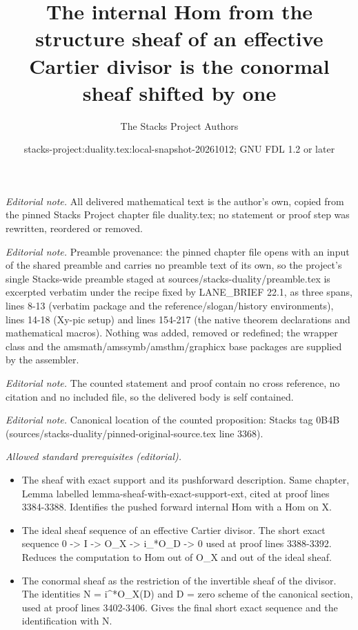 \documentclass[10pt,a4paper]{amsart}
\title{The internal Hom from the structure sheaf of an effective Cartier divisor is the conormal sheaf shifted by one}
\author{The Stacks Project Authors}
\date{stacks-project:duality.tex:local-snapshot-20261012; GNU FDL 1.2 or later}
\theoremstyle{plain}
\theoremstyle{definition}
\theoremstyle{remark}
\numberwithin{equation}{subsection}
\begin{document}
\maketitle
\noindent\textit{Editorial note.} All delivered mathematical text is the author's own, copied from the pinned Stacks Project chapter file duality.tex; no statement or proof step was rewritten, reordered or removed.\par\medskip
\noindent\textit{Editorial note.} Preamble provenance: the pinned chapter file opens with an input of the shared preamble and carries no preamble text of its own, so the project's single Stacks-wide preamble staged at sources/stacks-duality/preamble.tex is excerpted verbatim under the recipe fixed by LANE\_BRIEF 22.1, as three spans, lines 8-13 (verbatim package and the reference/slogan/history environments), lines 14-18 (Xy-pic setup) and lines 154-217 (the native theorem declarations and mathematical macros). Nothing was added, removed or redefined; the wrapper class and the amsmath/amssymb/amsthm/graphicx base packages are supplied by the assembler.\par\medskip
\noindent\textit{Editorial note.} The counted statement and proof contain no cross reference, no citation and no included file, so the delivered body is self contained.\par\medskip
\noindent\textit{Editorial note.} Canonical location of the counted proposition: Stacks tag 0B4B (sources/stacks-duality/pinned-original-source.tex line 3368).\par\medskip
\noindent\textit{Allowed standard prerequisites (editorial).}\begin{itemize}
\item The sheaf with exact support and its pushforward description. Same chapter, Lemma labelled lemma-sheaf-with-exact-support-ext, cited at proof lines 3384-3388. Identifies the pushed forward internal Hom with a Hom on X.
\item The ideal sheaf sequence of an effective Cartier divisor. The short exact sequence 0 -> I -> O\_X -> i\_*O\_D -> 0 used at proof lines 3388-3392. Reduces the computation to Hom out of O\_X and out of the ideal sheaf.
\item The conormal sheaf as the restriction of the invertible sheaf of the divisor. The identities N = i\textasciicircum{}*O\_X(D) and D = zero scheme of the canonical section, used at proof lines 3402-3406. Gives the final short exact sequence and the identification with N.
\end{itemize}\medskip
\end{document}
